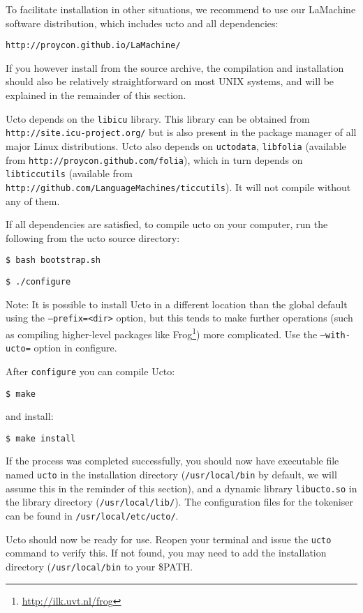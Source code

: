 \documentclass[a4paper,12pt]{report}
\begin{document}
To facilitate installation in other situations, we recommend to use our
LaMachine software distribution, which includes ucto and all dependencies:

{\tt http://proycon.github.io/LaMachine/}

If you however install from the source archive, the compilation and installation should also be relatively straightforward on most UNIX systems, and will be explained in the remainder of this section. 

Ucto depends on the \texttt{libicu} library. This library can be obtained from \\
{\tt http://site.icu-project.org/} but is also present in the package manager of all major Linux distributions.
Ucto also depends on \texttt{uctodata}, \texttt{libfolia} (available from
\texttt{http://proycon.github.com/folia}), which in turn depends on \texttt{libticcutils} (available from
\texttt{http://github.com/LanguageMachines/ticcutils}). It will not compile
without any of them.

If all dependencies are satisfied, to compile ucto on your computer, run the
following from the ucto source directory:

{\tt \$ bash bootstrap.sh}

{\tt \$ ./configure}

Note: It is possible to install Ucto in a different location than the global default using the \texttt{--prefix=<dir>} option, but this tends to make further operations (such as compiling higher-level packages like Frog\footnote{\url{http://ilk.uvt.nl/frog}}) more complicated. Use the {\tt --with-ucto=} option in configure. 
 
After {\tt configure} you can compile Ucto:

{\tt \$ make}

and install:

{\tt \$ make install }

If the process was completed successfully, you should now have
executable file named {\tt ucto} in the installation directory
({\tt /usr/local/bin} by default, we will assume this in the reminder of this section), and a dynamic library {\tt libucto.so} in
the library directory ({\tt /usr/local/lib/}). The configuration files for the tokeniser can be found in {\tt /usr/local/etc/ucto/}.

Ucto should now be ready for use. Reopen your terminal and issue the {\tt ucto} command to verify this. If not found, you may need to add the installation directory ({\tt /usr/local/bin} to your \$PATH. 
\end{document}
